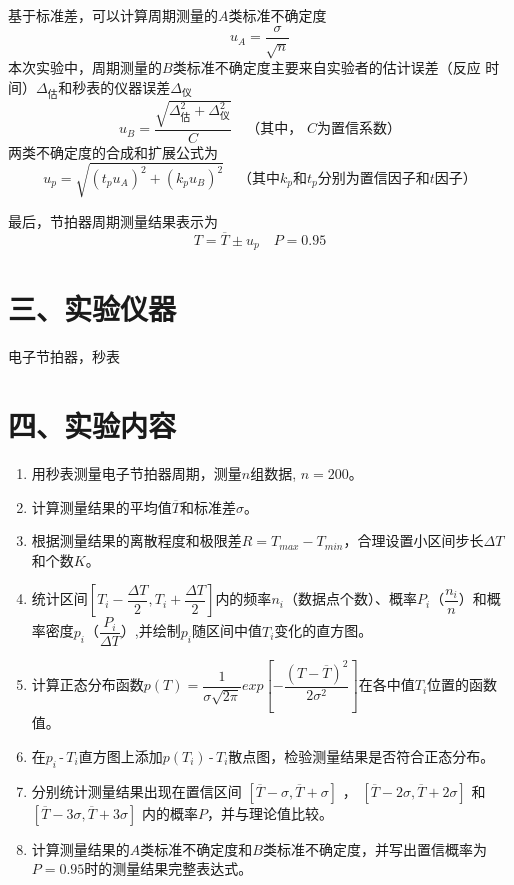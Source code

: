 \documentclass[11pt]{article}
\begin{document}
基于标准差，可以计算周期测量的$A$类标准不确定度
$$
u_A=\dfrac{\sigma}{\sqrt{n}}
$$
本次实验中，周期测量的$B$类标准不确定度主要来自实验者的估计误差（反应
时间）$\Delta_{\text{估}}$和秒表的仪器误差$\Delta_{\text{仪}}$
$$
u_B=\dfrac{\sqrt{\Delta_{\text{估}}^2+\Delta_{\text{仪}}^2}}{C}\quad\text{（其中， }C\text{为置信系数）}
$$
两类不确定度的合成和扩展公式为
$$
u_p=\sqrt{(t_pu_A)^2+(k_pu_B)^2}\quad\text{（其中}k_p\text{和}t_p\text{分别为置信因子和}t\text{因子）}
$$

最后，节拍器周期测量结果表示为
$$
T=\overline{T}\pm u_p\quad P=0.95
$$

\section*{三、实验仪器}

电子节拍器，秒表

\section*{四、实验内容}

\begin{enumerate}
    \item 用秒表测量电子节拍器周期，测量$n$组数据, $n=200$。
    \item 计算测量结果的平均值$\overline{T}$和标准差$\sigma$。
    \item 根据测量结果的离散程度和极限差$R=T_{max}-T_{min}$，合理设置小区间步长$\Delta T$和个数$K$。
    \item 统计区间$\left[T_i-\dfrac{\Delta T}{2}, T_i+\dfrac{\Delta T}{2}\right]$内的频率$n_i$（数据点个数）、概率$P_i$（$\dfrac{n_i}{n}$）和概率密度$p_i$（$\dfrac{P_i}{\Delta T}$）,并绘制$p_i$随区间中值$T_i$变化的直方图。
    \item 计算正态分布函数$p(T)=\dfrac{1}{\sigma\sqrt{2\pi}}exp\left[-\dfrac{\left(T-\overline{T}\right)^2}{2\sigma^2}\right]$在各中值$T_i$位置的函数值。
    \item 在$p_i$\,-\,$T_i$直方图上添加$p(T_i)$\,-\,$T_i$散点图，检验测量结果是否符合正态分布。
    \item 分别统计测量结果出现在置信区间 $\left[\overline{T}-\sigma, \overline{T}+\sigma\right]$ ， $\left[\overline{T}-2\sigma, \overline{T}+2\sigma\right]$ 和 $\left[\overline{T}-3\sigma, \overline{T}+3\sigma\right]$ 内的概率$P$，并与理论值比较。
    \item 计算测量结果的$A$类标准不确定度和$B$类标准不确定度，并写出置信概率为$P=0.95$时的测量结果完整表达式。
\end{enumerate}
\end{document}
